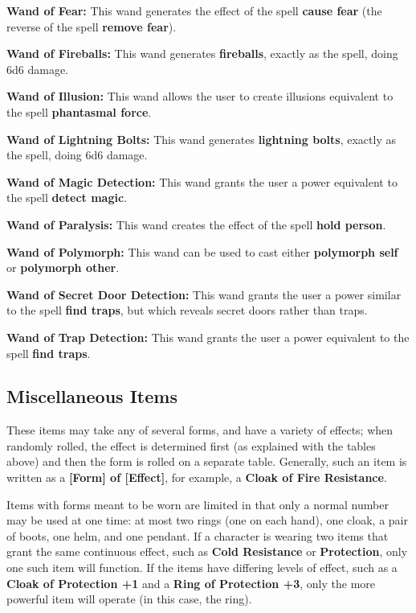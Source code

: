 \documentclass[a4paper,twoside,openany,10pt]{book}
\begin{document}
\begin{multicols}{2}
\textbf{Wand of Fear: } This wand generates the effect of the spell \textbf{cause fear }(the reverse of the spell \textbf{remove fear}).

\textbf{Wand of Fireballs: } This wand generates \textbf{fireballs}, exactly as the spell, doing 6d6 damage.

\textbf{Wand of Illusion: } This wand allows the user to create illusions equivalent to the spell \textbf{phantasmal force}.

\textbf{Wand of Lightning Bolts: } This wand generates \textbf{lightning bolts}, exactly as the spell, doing 6d6 damage.

\textbf{Wand of Magic Detection:} This wand grants the user a power equivalent to the spell \textbf{detect magic}.

\textbf{Wand of Paralysis: } This wand creates the effect of the spell \textbf{hold person}.

\textbf{Wand of Polymorph: } This wand can be used to cast either \textbf{polymorph self} or \textbf{polymorph other}.

\textbf{Wand of Secret Door Detection: } This wand grants the user a power similar to the spell \textbf{find traps}, but which reveals secret doors rather than traps.

\textbf{Wand of Trap Detection: } This wand grants the user a power equivalent to the spell \textbf{find traps}.

\subsection{Miscellaneous Items}\label{miscellaneous-items-1}

These items may take any of several forms, and have a variety of effects; when randomly rolled, the effect is determined first (as explained with the tables above) and then the form is rolled on a separate table. Generally, such an item is written as a \textbf{{[}Form{]} of {[}Effect{]}}, for example, a \textbf{Cloak of Fire Resistance}.

Items with forms meant to be worn are limited in that only a normal number may be used at one time: at most two rings (one on each hand), one cloak, a pair of boots, one helm, and one pendant. If a character is wearing two items that grant the same continuous effect, such as \textbf{Cold Resistance} or \textbf{Protection}, only one such item will function. If the items have differing levels of effect, such as a \textbf{Cloak of Protection +1} and a \textbf{Ring of Protection +3}, only the more powerful item will operate (in this case, the ring).


\end{multicols}
\end{document}
